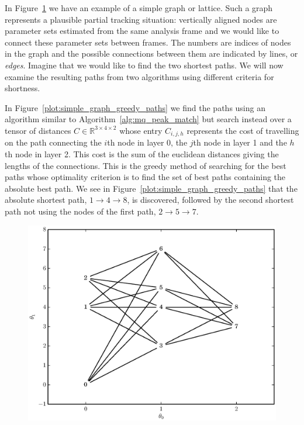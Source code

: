In Figure~\ref{plot:simple_graph} we have an example of a simple graph or
lattice. Such a graph represents a plausible partial tracking situation:
vertically aligned nodes are parameter sets estimated from the same analysis
frame and we would like to connect these parameter sets between frames. The
numbers are indices of nodes in the graph and the possible connections between
them are indicated by lines, or \textit{edges}. Imagine that we would like to
find the two shortest paths. We will now examine the resulting paths from two
algorithms using different criteria for shortness.

In Figure~\ref{plot:simple_graph_greedy_paths} we find the paths using an
algorithm similar to Algorithm~\ref{alg:mq_peak_match} but search instead over a
tensor of distances $C \in \mathbb{R}^{3 \times 4 \times 2}$ whose entry
$C_{i,j,h}$ represents the cost of travelling on the path connecting the $i$th
node in layer 0, the $j$th node in layer 1 and the $h$th node in layer 2. This
cost is the sum of the euclidean distances giving the lengths of the
connections. This is the greedy method of searching for the best paths whose
optimality criterion is to find the set of best paths containing the absolute
best path. We see in Figure~\ref{plot:simple_graph_greedy_paths} that the
absolute shortest path, $1 \rightarrow 4 \rightarrow 8$, is discovered, followed
by the second shortest path not using the nodes of the first path, $2
\rightarrow 5 \rightarrow 7$.

\begin{figure}[!t]
    \caption{\label{plot:simple_graph}}
    \centering
    \includegraphics[width=\figwidthscale\textwidth]{plots/small_graph_ex.eps}
    \CaptionWithTitle{%
    }{}
\end{figure}

